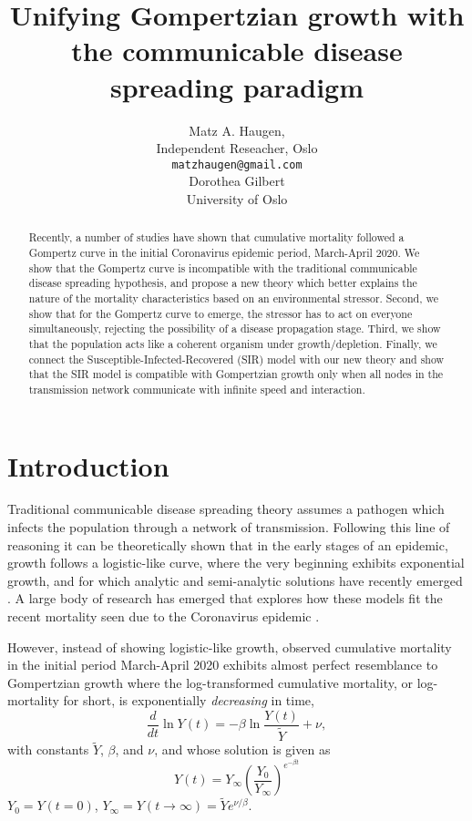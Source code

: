 \documentclass{article}
\title{Unifying Gompertzian growth with the communicable disease spreading paradigm}
\author{Matz A. Haugen, \\
Independent Reseacher, Oslo\\
\texttt{matzhaugen@gmail.com} \\
  \And
  Dorothea Gilbert \\
  University of Oslo\\
}
\begin{document}
\maketitle

\begin{abstract}
Recently, a number of studies have shown that cumulative mortality followed a Gompertz curve in the initial Coronavirus epidemic period, March-April 2020. 
We show that the Gompertz curve is incompatible with the traditional communicable disease spreading hypothesis, and propose a new theory which better explains the nature of the mortality characteristics based on an environmental stressor. 
Second, we show that for the Gompertz curve to emerge, the stressor has to act on everyone simultaneously, rejecting the possibility of a disease propagation stage. 
Third, we show that the population acts like a coherent organism under growth/depletion. 
Finally, we connect the Susceptible-Infected-Recovered (SIR) model with our new theory and show that the SIR model is compatible with Gompertzian growth only when all nodes in the transmission network communicate with infinite speed and interaction.
\end{abstract}


\section{Introduction}
Traditional communicable disease spreading theory assumes a pathogen which infects the population through a network of transmission. 
Following this line of reasoning it can be theoretically shown that in the early stages of an epidemic, growth follows a logistic-like curve, where the very beginning exhibits exponential growth, and for which analytic and semi-analytic solutions have recently emerged \citep{harko2014exact,kroger2020analytical,schlickeiser2021analytical,heng2020approximately}. 
A large body of research has emerged that explores how these models fit the recent mortality seen due to the Coronavirus epidemic \citep{carletti2020covid,cooper2020sir,postnikov2020estimation,munoz2021sir,cooper2022dynamical,saikia2021covid}. 

However, instead of showing logistic-like growth, observed cumulative mortality in the initial period March-April 2020 exhibits almost perfect resemblance to Gompertzian growth \citep{Gompertz1825} where the log-transformed cumulative mortality, or log-mortality for short, is exponentially \emph{decreasing} in time,
\begin{equation}
\label{eq:GompertzODE}
\frac{d}{dt}\ln{Y(t)} = -\beta\ln{\frac{Y(t)}{\tilde{Y}}} + \nu,
\end{equation} 
with constants $\tilde{Y}$, $\beta$, and $\nu$, and whose solution is given as
\begin{equation}
\label{eq:gomp_solution}
Y(t) = Y_\infty \left(\frac{Y_0}{Y_\infty}\right)^{e^{-\beta t}}
\end{equation}
$Y_{0}=Y(t = 0)$, $Y_{\infty}=Y(t\rightarrow \infty)=\tilde{Y}e^{\nu/\beta}$. 
\end{document}
